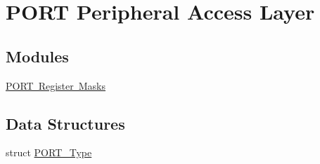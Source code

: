 \hypertarget{group___p_o_r_t___peripheral___access___layer}{}\section{P\+O\+RT Peripheral Access Layer}
\label{group___p_o_r_t___peripheral___access___layer}
\subsection*{Modules}
\begin{DoxyCompactItemize}
\item 
\mbox{\hyperlink{group___p_o_r_t___register___masks}{P\+O\+R\+T Register Masks}}
\end{DoxyCompactItemize}
\subsection*{Data Structures}
\begin{DoxyCompactItemize}
\item 
struct \mbox{\hyperlink{struct_p_o_r_t___type}{P\+O\+R\+T\+\_\+\+Type}}
\end{DoxyCompactItemize}
